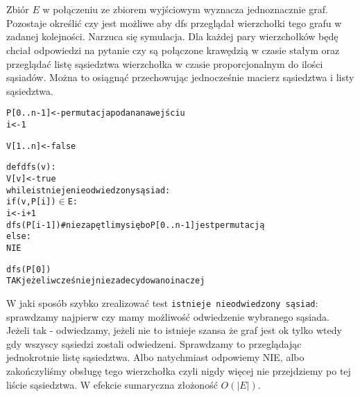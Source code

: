 \documentclass[a4paper,12pt]{article}
\begin{document}
\section{}
Zbiór $E$ w połączeniu ze zbiorem wyjściowym wyznacza jednoznacznie graf. Pozostaje określić czy jest możliwe aby dfs przeglądał wierzchołki tego grafu w zadanej kolejności.
Narzuca się symulacja. Dla każdej pary wierzchołków będę chciał odpowiedzi na pytanie czy są połączone krawędzią w czasie stałym oraz przeglądać listę sąsiedztwa wierzchołka w czasie proporcjonalnym do ilości sąsiadów. Można to osiągnąć przechowując jednocześnie macierz sąsiedztwa i listy sąsiedztwa.
\begin{alltt}
P[0..n-1] <- permutacja podana na wejściu
i <- 1

V[1..n] <- false
    
 def dfs(v):
    V[v] <- true
    while istnieje nieodwiedzony sąsiad:
        if (v,P[i]) \(\in\) E:
            i <- i+1
            dfs(P[i-1]) # nie zapętlimy się bo P[0..n-1] jest permutacją
        else:
            NIE
    
 dfs(P[0])
 TAK jeżeli wcześniej nie zadecydowano inaczej
\end{alltt}
W jaki sposób szybko zrealizować test \verb|istnieje nieodwiedzony sąsiad|: sprawdzamy najpierw czy mamy możliwość odwiedzenie wybranego sąsiada. Jeżeli tak - odwiedzamy, jeżeli nie to istnieje szansa że graf jest ok tylko wtedy gdy wszyscy sąsiedzi zostali odwiedzeni. Sprawdzamy to przeglądając jednokrotnie listę sąsiedztwa. Albo natychmiast odpowiemy NIE, albo zakończyliśmy obsługę tego wierzchołka czyli nigdy więcej nie przejdziemy po tej liście sąsiedztwa. W efekcie sumaryczna złożoność $O(|E|)$. 
\end{document}
